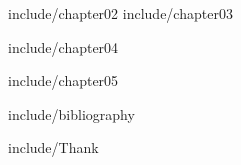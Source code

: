 \documentclass[11pt,dvipdfmx]{jsarticle}
\begin{document}
  {include/chapter02}
  {include/chapter03}

  {include/chapter04}

  {include/chapter05}

  {include/bibliography}

  {include/Thank}
\clearpage

\setcounter{page}{1}

%

%

%
%
\end{document}
